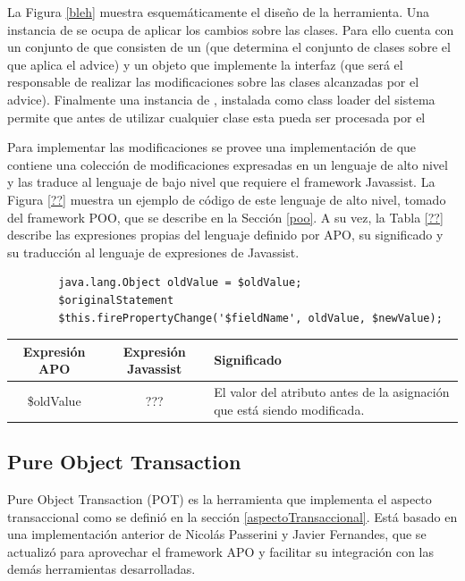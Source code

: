 	La Figura \ref{bleh} muestra esquemáticamente el diseño de la herramienta.
	Una instancia de  se ocupa de aplicar los cambios sobre las
	clases.
	Para ello cuenta con un conjunto de  que consisten de un
	 (que determina el conjunto de clases sobre el que aplica el
	advice) y un objeto que implemente la interfaz  (que
	será el responsable de realizar las modificaciones sobre
	las clases alcanzadas por el advice).
	Finalmente una instancia de , instalada como class loader
	del sistema permite que antes de utilizar cualquier clase esta pueda ser procesada por el 
	
	Para implementar las modificaciones se provee una implementación de
	 que contiene una colección de modificaciones expresadas en un
	lenguaje de alto nivel y las traduce al lenguaje de bajo nivel que requiere el
	framework Javassist.
	La Figura \ref{??} muestra un ejemplo de código de este lenguaje de alto nivel,
	tomado del framework POO, que se describe en la Sección \ref{poo}.
	A su vez, la Tabla \ref{??} describe las expresiones propias del lenguaje
	definido por APO, su significado y su traducción al lenguaje de expresiones de
	Javassist.

	\begin{lstlisting}
		java.lang.Object oldValue = $oldValue; 
		$originalStatement
		$this.firePropertyChange('$fieldName', oldValue, $newValue);
	\end{lstlisting}
	
	\begin{tabular}{|c|c|p{6cm}|}
	\hline
	Expresión APO & Expresión Javassist & Significado \\
	\hline
	\$oldValue & ??? & El valor del atributo antes de la asignación que está siendo
	modificada.
	\\
	\hline
	\end{tabular} 
	
	\subsection{Pure Object Transaction}
		\label{pot} 
		Pure Object Transaction (POT) es la herramienta que implementa el aspecto
		transaccional como se definió en la sección \ref{aspectoTransaccional}.
		Está basado en una implementación anterior de Nicolás Passerini y Javier
		Fernandes, que se actualizó para aprovechar el framework APO y facilitar su
		integración con las demás herramientas desarrolladas.
		

